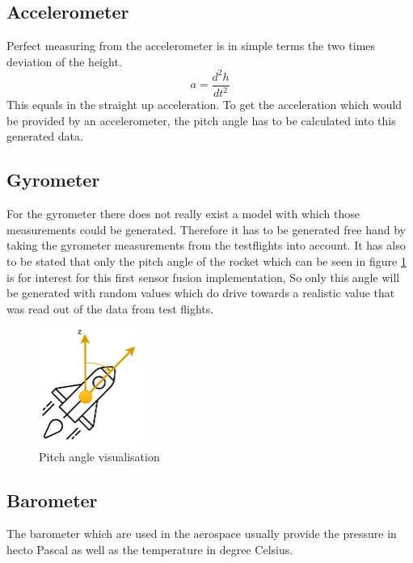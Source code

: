   \subsection{Accelerometer}
  Perfect measuring from the accelerometer is in simple terms the two times deviation of the height.
  $$a = \frac{d^2h}{dt^2}$$
  This equals in the straight up acceleration. To get the acceleration which would be provided by an accelerometer,
  the pitch angle has to be calculated into this generated data.
  
  \subsection{Gyrometer}
  For the gyrometer there does not really exist a model with which those measurements could be generated.
  Therefore it has to be generated free hand by taking the gyrometer measurements from the testflights into account.
  It has also to be stated that only the pitch angle of the rocket which can be seen in figure \ref{fig:RocketPitchAngle} is for interest for this first sensor fusion implementation,
  So only this angle will be generated with random values which do drive towards a realistic value that was read out of the data from test flights.
  
  \begin{figure}[h!]
    \centering
    \includegraphics[width = 0.3\textwidth]{./Pictures/RocketSyMod.pdf}
    \caption{Pitch angle visualisation}
    \label{fig:RocketPitchAngle}
  \end{figure}

  
  \subsection{Barometer}
  The barometer which are used in the aerospace usually provide the pressure in hecto Pascal as well as the temperature in degree Celsius.
